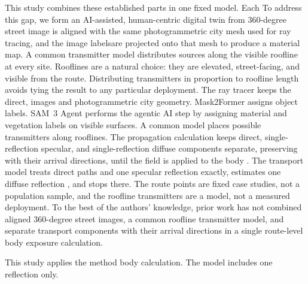 \documentclass{IEEEoj} %
\providecommand{\DIFadd}[1]{{\protect\color{blue} \sf #1}} %
\providecommand{\DIFdel}[1]{{\protect\color{red} \scriptsize #1}} %
\providecommand{\DIFaddbegin}{} %
\providecommand{\DIFaddend}{} %
\providecommand{\DIFdelbegin}{} %
\providecommand{\DIFdelend}{} %
\begin{document}
\DIFdelbegin \DIFdel{This study combines these established parts in one fixed model.
Each }\DIFdelend \DIFaddbegin \DIFadd{To address this gap, we form an AI-assisted, human-centric digital twin from
}\DIFaddend 360-degree street \DIFdelbegin \DIFdel{image is aligned with the same photogrammetric city mesh used for ray
tracing, and the image labelsare projected onto that mesh to produce a material map. A common transmitter model distributes sources along the visible
roofline at every site. Rooflines are a natural choice: they are elevated, street-facing, and visible
from the route. Distributing transmitters in proportion to roofline length
avoids tying the result to any particular deployment. The ray tracer keeps
the direct, }\DIFdelend \DIFaddbegin \DIFadd{images and photogrammetric city geometry. Mask2Former assigns
object labels. SAM~3 Agent performs the agentic AI step by assigning material
and vegetation labels on visible surfaces. A common model
places possible transmitters along rooflines. The propagation calculation keeps
direct, single-reflection }\DIFaddend specular, and \DIFaddbegin \DIFadd{single-reflection }\DIFaddend diffuse components
separate, \DIFdelbegin \DIFdel{preserving }\DIFdelend \DIFaddbegin \DIFadd{with }\DIFaddend their arrival directions, until the \DIFdelbegin \DIFdel{field is applied to the body . The transport model
treats direct paths and one
specular reflection exactly, estimates one diffuse reflection , and stops there.
The route points are fixed case studies, not a population sample, and the
roofline transmitters are a model, not a measured deployment. To the best of the authors' knowledge, prior work has not combined aligned
360-degree street images, a common roofline transmitter model, and separate
transport components with their arrival directions in a single route-level body
exposure calculation.
}%

\DIFdel{This study applies the method }\DIFdelend \DIFaddbegin \DIFadd{body calculation. The model
includes one reflection only.
}
\end{document}
